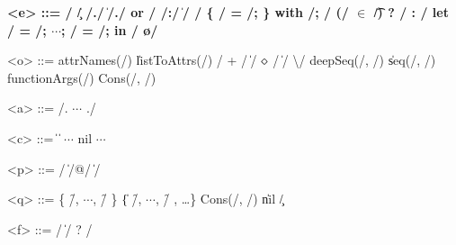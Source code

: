 \begin{grammar}
  \bfseries
  <e> ::=
    \x/ \| \c/
    \alt \e/.\a/ \| \e/.\a/ or \e/
    \alt \p/:\e/ \| \e/ \e/
    \alt \{ \e/ = \e/; \}
    \alt with \e/; \e/
    \alt (\e/ $\bm{\in}$ \t/) ? \e/ : \e/
    \alt let \x/ = \e/; $\cdots{}$; \x/ = \e/; in \e/
    \alt \o/

    <o> ::= attrNames(\e/) \| listToAttrs(\e/)
    \alt \e/ + \e/ \| \e/ $\diamond$ \e/ \| \e/ \textbackslash \e/
    \alt deepSeq(\e/, \e/) \| seq(\e/, \e/)
    \alt functionArgs(\e/)
    \alt Cons(\e/, \e/)

  <a> ::= \e/. $\cdots{}$ .\e/

  <c> ::=  \|  \| $\cdots{}$
    \alt nil
    \alt $\cdots{}$

  <p> ::= \q/ \| \q/@\x/ \| \x/

  <q> ::= \{ \f/, $\cdots{}$, \f/ \} \| \{ \f/, $\cdots{}$, \f/ , \ldots{}\}
    \alt Cons(\x/, \x/) \| nil
    \alt \c/

  <f> ::= \x/ \| \x/ ? \e/

\end{grammar}
